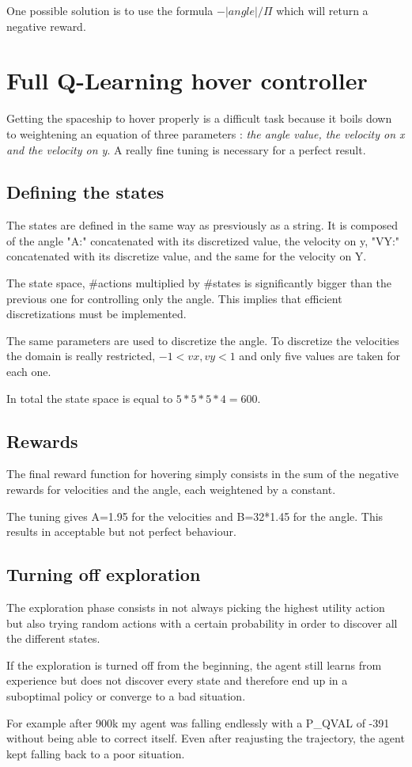 One possible solution is to use the formula $-|angle|/\Pi$ which will
return a negative reward. 

\section*{Full Q-Learning hover controller}

Getting the spaceship to hover properly is a difficult task because it
boils down to weightening an equation of three parameters : \textit{the
angle value, the velocity on x and the velocity on y}.
A really fine tuning is necessary for a perfect result.

\subsection*{Defining the states} 

The states are defined in the same way as presviously as a string. It
is composed of the angle "A:" concatenated with its discretized value, the
velocity on y, "VY:" concatenated with its discretize value, and the same
for the velocity on Y.

The state space, \#actions multiplied by \#states is significantly bigger
than the previous one for controlling only the angle. This implies that
efficient discretizations must be implemented.

The same parameters are used to discretize the angle. To discretize the
velocities the domain is really restricted, $-1<vx,vy<1$ and only five
values are taken for each one.

In total the state space is equal to $5*5*5*4=600$.

\subsection*{Rewards}

The final reward function for hovering simply consists in the sum of the
negative rewards for velocities and the angle, each weightened by a
constant.

The tuning gives A=1.95 for the velocities and B=32*1.45 for the angle.
This results in acceptable but not perfect behaviour.

\newpage
\thispagestyle{empty}
\subsection*{Turning off exploration}

The exploration phase consists in not always picking the highest utility
action but also trying random actions with a certain probability in order
to discover all the different states.

If the exploration is turned off from the beginning, the agent still learns
from experience but does not discover every state and therefore end up in
a suboptimal policy or converge to a bad situation.

For example after 900k my agent was falling endlessly with a P\_QVAL of
-391 without being able to correct itself.
Even after reajusting the trajectory, the agent kept falling back to a poor
situation.
